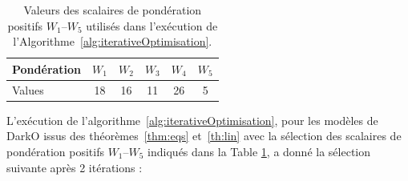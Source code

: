 \begin{table}
    \centering
    \begin{tabular}{|l|c|c|c|c|c|} 
    \hline
    Pondération & $W_1$ & $W_2$ & $W_3$ & $W_4$ & $W_5$ \\ \hline
    Values &18 & 16 & 11 & 26 & 5 \\ \hline
    \end{tabular}
    \caption{\label{tab:W1W5} Valeurs des scalaires de pondération positifs $W_1$--$W_5$ utilisés dans l'exécution de l'Algorithme~\ref{alg:iterativeOptimisation}.}
\end{table}
L'exécution de l'algorithme~\ref{alg:iterativeOptimisation}, pour les modèles de DarkO issus des théorèmes~\ref{thm:eqs} et~\ref{th:lin} avec la sélection des scalaires de pondération positifs $W_1$--$W_5$ indiqués dans la Table \ref{tab:W1W5}, a donné la sélection suivante après 2 itérations :
